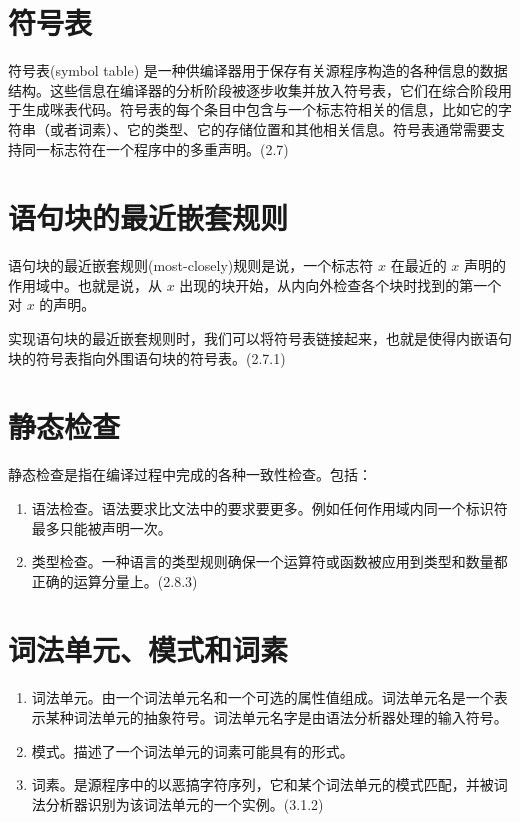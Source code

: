 \section*{符号表}

符号表(symbol table) 是一种供编译器用于保存有关源程序构造的各种信息的数据结构。这些信息在编译器的分析阶段被逐步收集并放入符号表，它们在综合阶段用于生成咪表代码。符号表的每个条目中包含与一个标志符相关的信息，比如它的字符串（或者词素）、它的类型、它的存储位置和其他相关信息。符号表通常需要支持同一标志符在一个程序中的多重声明。(2.7)


\section*{语句块的最近嵌套规则}

语句块的最近嵌套规则(most-closely)规则是说，一个标志符 $x$ 在最近的 $x$ 声明的作用域中。也就是说，从 $x$ 出现的块开始，从内向外检查各个块时找到的第一个对 $x$ 的声明。

实现语句块的最近嵌套规则时，我们可以将符号表链接起来，也就是使得内嵌语句块的符号表指向外围语句块的符号表。(2.7.1)

\section*{静态检查}

静态检查是指在编译过程中完成的各种一致性检查。包括：
\begin{enumerate}
\item 语法检查。语法要求比文法中的要求要更多。例如任何作用域内同一个标识符最多只能被声明一次。
\item 类型检查。一种语言的类型规则确保一个运算符或函数被应用到类型和数量都正确的运算分量上。(2.8.3)
\end{enumerate}


\section*{词法单元、模式和词素}

\begin{enumerate}
\item 词法单元。由一个词法单元名和一个可选的属性值组成。词法单元名是一个表示某种词法单元的抽象符号。词法单元名字是由语法分析器处理的输入符号。
\item 模式。描述了一个词法单元的词素可能具有的形式。
\item 词素。是源程序中的以恶搞字符序列，它和某个词法单元的模式匹配，并被词法分析器识别为该词法单元的一个实例。(3.1.2)
\end{enumerate}

